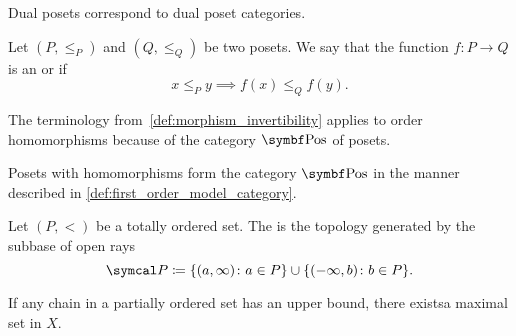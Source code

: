 \begin{proposition}\label{thm:dual_poset_dual_poset_category}
  Dual posets correspond to dual poset categories.
\end{proposition}

\begin{definition}\label{def:order_homomorphism}
  Let \( (P, \leq_P) \) and \( (Q, \leq_Q) \) be two posets. We say that the function \( f: P \to Q \) is an  or  if
  \begin{equation*}
    x \leq_P y \implies f(x) \leq_Q f(y).
  \end{equation*}

  The terminology from~\cref{def:morphism_invertibility} applies to order homomorphisms because of the category \( \Cat{Pos} \) of posets.
\end{definition}

\begin{definition}\label{def:category_of_posets}
  Posets with homomorphisms form the category \( \Cat{Pos} \) in the manner described in \cref{def:first_order_model_category}.
\end{definition}

\begin{definition}\label{def:order_topology}\cite{nLab:order_topology}
  Let \( (P, <) \) be a totally ordered set. The  is the topology generated by the subbase of open rays
  \begin{equation*}
    \Cal{P} \coloneqq \{ (a, \infty) \colon a \in P \} \cup \{ (-\infty, b) \colon b \in P \}.
  \end{equation*}
\end{definition}

\begin{lemma}\label{thm:zorns_lemma}\cite{nLab:zorns_lemma}
  If any chain in a partially ordered set has an upper bound, there exists\AOC a maximal set in \( X \).
\end{lemma}
